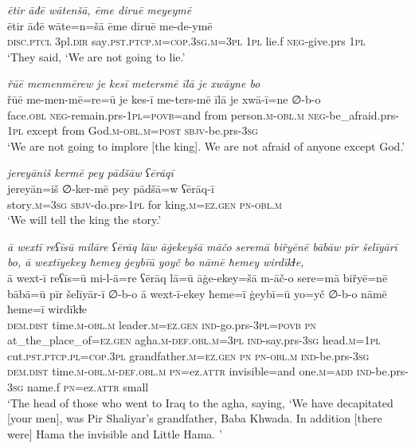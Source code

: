 \ea \label{BP.117}
\textit{ētir āđē wātenšā, ēme diruē meyeymē} \\ 
\gll ētir āđē wāte=n=šā ēme diruē me-de-ymē \\ 
 \textsc{disc.ptcl} 3pl\textsc{.dir} say\textsc{.pst}\textsc{.ptcp}\textsc{.m}\textsc{=cop}\textsc{.3sg}\textsc{.m}\textsc{=3pl} \textsc{1pl} lie.f \textsc{neg-}give.prs \textsc{1pl} \\ 
\glt `They said, ‘We are not going to lie.'
\z 
 
\ea \label{BP.118}
\textit{řūē memenmērew je kesī metersmē īlā je xwāyne bo} \\ 
\gll řūē me-men-mē=re=ū je kes-ī me-ters-mē īlā je xwā-ī=ne ∅-b-o \\ 
 face\textsc{.obl} \textsc{neg-}remain.prs\textsc{-\textsc{1pl}}\textsc{=\textsc{povb}}=and from person\textsc{.m}\textsc{-obl}\textsc{.m} \textsc{neg-}be\_afraid.prs\textsc{-\textsc{1pl}} except from God\textsc{.m}\textsc{-obl}\textsc{.m}\textsc{=\textsc{post}} \textsc{sbjv-}be.prs\textsc{-3sg} \\ 
\glt `We are not going to implore [the king]. We are not afraid of anyone except God.'
\z 
 
\ea \label{BP.120}
\textit{jereyāniš kermē pey pādšāw ʕērāqī} \\ 
\gll jereyān=iš ∅-ker-mē pey pādšā=w ʕērāq-ī \\ 
 story\textsc{.m}\textsc{=3sg} \textsc{sbjv-}do.prs\textsc{-\textsc{1pl}} for king\textsc{.m}\textsc{=ez.gen} \textsc{pn}\textsc{-obl}\textsc{.m} \\ 
\glt `We will tell the king the story.'
\z 
 
\ea \label{BP.122}
\textit{ā wextī reʕīsū milāre ʕērāq lāw āġekeyšā māčo seremā biřyēnē bābāw pīr šelīyārī bo, ā wextīyekey ħemey ġeybīū yoyč bo nāmē ħemey wirdīkɫe,} \\ 
\gll ā wext-ī reʕīs=ū mi-l-ā=re ʕērāq lā=ū āġe-ekey=šā m-āč-o sere=mā biřyē=nē bābā=ū pīr šelīyār-ī ∅-b-o ā wext-ī-ekey ħeme=ī ġeybī=ū yo=yč ∅-b-o nāmē ħeme=ī wirdīkɫe \\ 
 \textsc{dem.dist} time\textsc{.m}\textsc{-obl}\textsc{.m} leader\textsc{.m}\textsc{=ez.gen} \textsc{ind-}go.prs\textsc{-3pl}\textsc{=\textsc{povb}} \textsc{pn} at\_the\_place\_of\textsc{=ez.gen} agha\textsc{.m}\textsc{-def}\textsc{.obl}\textsc{.m}\textsc{=3pl} \textsc{ind-}say.prs\textsc{-3sg} head\textsc{.m}\textsc{=\textsc{1pl}} cut\textsc{.pst}\textsc{.ptcp}\textsc{.pl}\textsc{=cop}\textsc{.3pl} grandfather\textsc{.m}\textsc{=ez.gen} \textsc{pn} \textsc{pn}\textsc{-obl}\textsc{.m} \textsc{ind-}be.prs\textsc{-3sg} \textsc{dem.dist} time\textsc{.m}\textsc{-obl}\textsc{.m}\textsc{-def}\textsc{.obl}\textsc{.m} \textsc{pn}=ez.\textsc{attr} invisible=and one\textsc{.m}\textsc{=add} \textsc{ind-}be.prs\textsc{-3sg} name.f \textsc{pn}=ez.\textsc{attr} small \\ 
\glt `The head of those who went to Iraq to the agha, saying, ‘We have decapitated [your men], was Pir Shaliyar’s grandfather, Baba Khwada. In addition [there were] Hama the invisible and Little Hama. '
\z 
 
